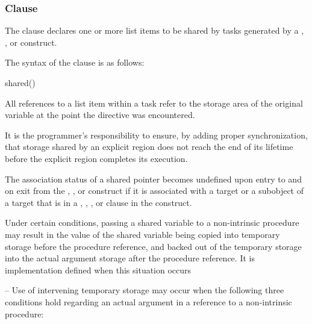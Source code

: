 \subsubsection{ Clause}
\label{subsubsec:shared clause}
\summary
The  clause declares one or more list items to be shared by tasks generated by 
a , ,  or  construct.

\syntax
The syntax of the  clause is as follows:

\begin{boxedcode}
shared()
\end{boxedcode}

\descr
All references to a list item within a task refer to the storage area of the original variable 
at the point the directive was encountered. 

It is the programmer's responsibility to ensure, by adding proper synchronization, that 
storage shared by an explicit  region does not reach the end of its lifetime before 
the explicit  region completes its execution. 

\fortranspecificstart
The association status of a shared pointer becomes undefined upon entry to and on exit 
from the , ,  or  construct if it
is associated with a target or a  subobject of a target that is in a ,
, , or  clause in the construct.

Under certain conditions, passing a shared variable to a non-intrinsic procedure may 
result in the value of the shared variable being copied into temporary storage before the 
procedure reference, and backed out of the temporary storage into the actual argument 
storage after the procedure reference. It is implementation defined when this situation 
occurs

\notestart
\noteheader – Use of intervening temporary storage may occur when the following three 
conditions hold regarding an actual argument in a reference to a non-intrinsic procedure:

